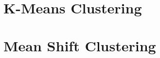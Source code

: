\documentclass[a4paper]{article}
\begin{document}
% 
% 
% 

\newpage
\section{K-Means Clustering}

% 
% 
% 

\newpage
\section{Mean Shift Clustering}

% 
% 
% 


% 
% 
% 



\end{document}
